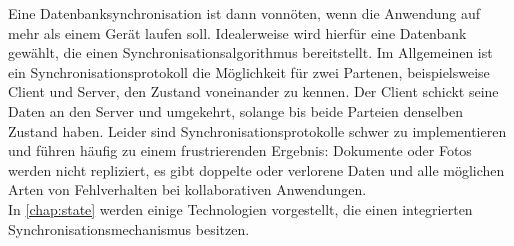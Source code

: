 Eine Datenbanksynchronisation ist dann vonnöten, wenn die Anwendung auf mehr als einem Gerät laufen soll.
Idealerweise wird hierfür eine Datenbank gewählt, die einen Synchronisationsalgorithmus bereitstellt.
Im Allgemeinen ist ein Synchronisationsprotokoll die Möglichkeit für zwei Partenen, beispielsweise Client und Server, den Zustand voneinander zu kennen. Der Client schickt seine Daten an den Server und umgekehrt, solange bis beide Parteien denselben Zustand haben.
Leider sind Synchronisationsprotokolle schwer zu implementieren und führen häufig zu einem frustrierenden Ergebnis: Dokumente oder Fotos werden nicht repliziert, es gibt doppelte oder verlorene Daten und alle möglichen Arten von Fehlverhalten bei kollaborativen Anwendungen.\\
In \autoref{chap:state} werden einige Technologien vorgestellt, die einen integrierten Synchronisationsmechanismus besitzen.
